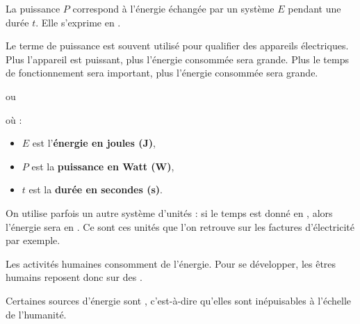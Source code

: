 \documentclass[11pt,a4paper]{article}
\begin{document}

La puissance $P$ correspond à l'énergie échangée par un système $E$ pendant une durée $t$. Elle s'exprime en .

Le terme de puissance est souvent utilisé pour qualifier des appareils électriques. Plus l’appareil est puissant, plus l’énergie consommée sera grande.
Plus le temps de fonctionnement sera important, plus l’énergie consommée sera grande.

\begin{center}
    \LARGE{} ou \LARGE{}
\end{center}

où :
\begin{itemize}
    \item $E$ est l'\textbf{énergie en joules (J)},
    \item $P$ est la \textbf{puissance en Watt (W)},
    \item $t$ est la \textbf{durée en secondes (s)}.
\end{itemize}

\vspace{6pt}

On utilise parfois un autre système d'unités : si le temps est donné en , alors l'énergie sera en . Ce sont ces unités que l'on retrouve sur les factures d'électricité par exemple.



Les activités humaines consomment de l'énergie. Pour se développer, les êtres humains reposent donc sur des .

Certaines sources d'énergie sont , c'est-à-dire qu'elles sont inépuisables à l’échelle de l’humanité.
\end{document}
